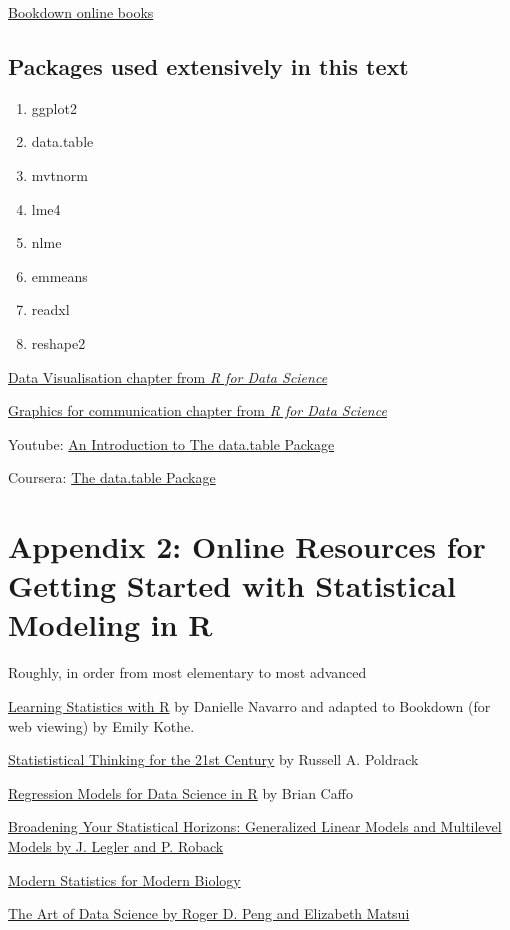 \documentclass[]{book}
\providecommand{\tightlist}{%
  \setlength{\itemsep}{0pt}\setlength{\parskip}{0pt}}
\begin{document}
\href{https://bookdown.org}{Bookdown online books}

\section{Packages used extensively in this
text}\label{packages-used-extensively-in-this-text}

\begin{enumerate}
\def\labelenumi{\arabic{enumi}.}
\tightlist
\item
  ggplot2
\item
  data.table
\item
  mvtnorm
\item
  lme4
\item
  nlme
\item
  emmeans
\item
  readxl
\item
  reshape2
\end{enumerate}

\href{http://r4ds.had.co.nz/data-visualisation.html}{Data Visualisation
chapter from \emph{R for Data Science}}

\href{http://r4ds.had.co.nz/graphics-for-communication.html}{Graphics
for communication chapter from \emph{R for Data Science}}

Youtube: \href{https://www.youtube.com/watch?v=pc1ARG6kbAM}{An
Introduction to The data.table Package}

Coursera:
\href{https://www.coursera.org/learn/data-cleaning/lecture/trMZ7/the-data-table-package}{The
data.table Package}

\chapter*{Appendix 2: Online Resources for Getting Started with
Statistical Modeling in
R}\label{appendix-2-online-resources-for-getting-started-with-statistical-modeling-in-r}

Roughly, in order from most elementary to most advanced

\href{https://https://learningstatisticswithr-bookdown.netlify.com}{Learning
Statistics with R} by Danielle Navarro and adapted to Bookdown (for web
viewing) by Emily Kothe.

\href{http://statsthinking21.org}{Statististical Thinking for the 21st
Century} by Russell A. Poldrack

\href{https://leanpub.com/regmods}{Regression Models for Data Science in
R} by Brian Caffo

\href{https://bookdown.org/roback/bookdown-bysh/}{Broadening Your
Statistical Horizons: Generalized Linear Models and Multilevel Models by
J. Legler and P. Roback}

\href{https://www.huber.embl.de/msmb/index.html}{Modern Statistics for
Modern Biology}

\href{https://bookdown.org/rdpeng/artofdatascience/}{The Art of Data
Science by Roger D. Peng and Elizabeth Matsui}


\end{document}
